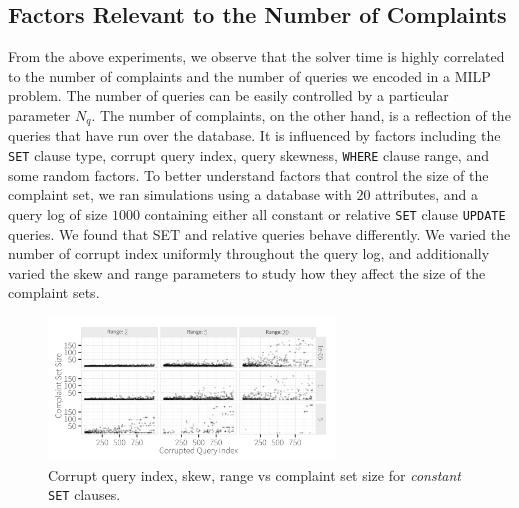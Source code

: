 \subsection{Factors Relevant to the Number of Complaints}

From the above experiments, we observe that the solver time is highly correlated to the number of complaints and the number of queries we encoded in a MILP problem. The number of queries can be easily controlled by a particular parameter $N_q$. The number of complaints, on the other hand, is a reflection of the queries that have run over the database. It is influenced by  factors including the \texttt{SET} clause type, corrupt query index, query skewness, \texttt{WHERE} clause range, and some random factors.   To better understand factors that control the size of the complaint set, we ran simulations using a database with $20$ attributes, and a query log of size $1000$ containing
either all constant or relative \texttt{SET} clause \texttt{UPDATE} queries. We found that SET and relative queries behave differently.
We varied the number of corrupt index uniformly throughout the query log, and additionally varied
the skew and range parameters to study how they affect the size of the complaint sets.



\begin{figure}[t]
\centering
\includegraphics[width = 3in]{figures/qidxsimulation/qidx_v_ncomplaints_20attrs_const}
\caption{Corrupt query index, skew, range vs complaint set size for \textit{constant} \texttt{SET} clauses.}
\label{f:qidx_v_ncomplaints_const} 
\end{figure}


